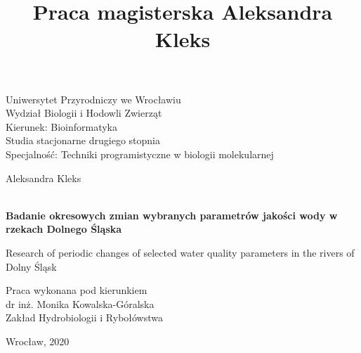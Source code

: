 \documentclass[12pt,a4paper]{article}
\title{Praca magisterska Aleksandra Kleks}
\begin{document}
\clearpage

\thispagestyle{empty}
\begin{center}
{\fontsize{20}{20}\selectfont Uniwersytet Przyrodniczy we Wrocławiu}\\
{\fontsize{18}{18}\selectfont Wydział Biologii i Hodowli Zwierząt}\\
{\fontsize{16}{16}\selectfont Kierunek: Bioinformatyka}\\
{\fontsize{16}{16}\selectfont Studia stacjonarne drugiego stopnia}\\
{\fontsize{16}{16}\selectfont Specjalność: Techniki programistyczne w biologii molekularnej}\\


\vspace{80pt}

{\fontsize{20}{20}\selectfont Aleksandra Kleks}\\
{\fontsize{14}{14}}\\

\vspace{64pt}

{\fontsize{24}{24}\selectfont \textbf{Badanie okresowych zmian wybranych parametrów jakości wody w rzekach Dolnego Śląska}}\\

\vspace{12pt}

{\fontsize{18}{18}\selectfont Research of periodic changes of selected water quality parameters in the rivers of Dolny Śląsk}\\
\end{center}

\vspace{160pt}

\begin{flushright}
{\fontsize{14}{14}\selectfont Praca wykonana pod kierunkiem}\\
{\fontsize{14}{14}\selectfont dr inż. Monika Kowalska-Góralska}\\
{\fontsize{14}{14}\selectfont Zakład Hydrobiologii i Rybołówstwa}
\end{flushright}

\vspace{32pt}

\begin{center}
{\fontsize{16}{16}\selectfont Wrocław, 2020}
\end{center}

\clearpage
\thispagestyle{empty}
\vspace*{76pt} 
\end{document}
